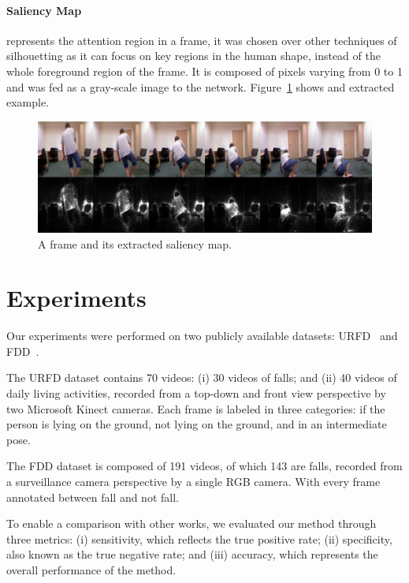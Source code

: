 \documentclass[10pt, conference, compsocconf]{IEEEtran}
\begin{document}
\paragraph{Saliency Map} represents the attention region in a frame, it was chosen over other techniques of silhouetting as it can focus on key regions in the human shape, instead of the whole foreground region of the frame. It is composed of pixels varying from 0 to 1 and was fed as a gray-scale image to the network. Figure~\ref{fig:sal} shows and extracted example.

\begin{figure}[!htb]
\centerline{\includegraphics[width=\linewidth]{figures/sal.png}}
\caption{A frame and its extracted saliency map.}
\label{fig:sal}
\end{figure}

\section{Experiments}
\label{sec:experiments}

Our experiments were performed on two publicly available
datasets: URFD~\cite{kepski2014human} and FDD~\cite{charfi2013optimised}.

The URFD dataset contains 70 videos: (i) 30 videos of falls; and (ii) 40 videos of daily living activities, recorded from a top-down and front view perspective by two Microsoft Kinect cameras. Each frame is labeled in three categories: if the person is lying on the ground, not lying on the ground, and in an intermediate pose.

The FDD dataset is composed of 191 videos, of which 143 are falls, recorded from a surveillance camera perspective by a single RGB camera. With every frame annotated between fall and not fall.

To enable a comparison with other works, we evaluated our method through three metrics: (i) sensitivity, which reflects the true positive rate; (ii) specificity, also known as the true negative rate; and (iii) accuracy, which represents the overall performance of the method.
\end{document}
